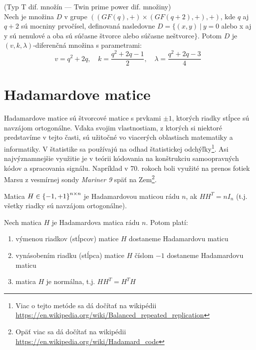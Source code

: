 \begin{theorem_hard}{(Typ T dif. množín --- Twin prime power dif. množiny)}\\ 
	Nech je množina $D$ v grupe $((GF(q), +) \times (GF(q + 2), +), +)$, kde $q$ aj $q + 2$ sú mocniny prvočísel, definovaná nasledovne $D = \{(x, y) ~|~ y = 0$ alebo x aj y sú nenulové a oba sú súčasne štvorce alebo súčasne neštvorce$\}$. Potom $D$ je $(v, k, \lambda)$-diferenčná množina s parametrami:
	$$v = q^2 + 2q, \quad k = \frac{q^2 + 2q - 1}{2}, \quad \lambda = \frac{q^2 + 2q - 3}{4}$$
\end{theorem_hard}


\section{Hadamardove matice}

Hadamardove matice sú štvorcové matice s prvkami $\pm 1$, ktorých riadky stĺpce sú navzájom ortogonálne. Vďaka svojim vlastnostiam, z ktorých si niektoré predstavíme v tejto časti, sú užitočné vo viacerých oblastiach matematiky a informatiky. V štatistike sa používajú na odhad štatistickej odchýľky\footnote{Viac o tejto metóde sa dá dočítať na wikipédii \url{https://en.wikipedia.org/wiki/Balanced_repeated_replication}}. Asi najvýznamnejšie využitie je v teórii kódovania na konštrukciu samoopravných kódov a spracovania signálu. Napríklad v 70. rokoch boli využité na prenos fotiek Marsu z vesmírnej sondy \emph{Mariner 9} späť na Zem\footnote{Opäť viac sa dá dočítať na wikipédii \url{https://en.wikipedia.org/wiki/Hadamard_code}}.

\begin{definition}
Matica $H \in \left\{-1, +1\right\}^{n \times n}$ je Hadamardovou maticou rádu $n$, ak $HH^T = nI_n$ (t.j. všetky riadky sú navzájom ortogonálne).
\end{definition}

\begin{theorem}
Nech matica $H$ je Hadamardova matica rádu $n$. Potom platí:
\begin{enumerate}
    \item výmenou riadkov (stĺpcov) matice $H$ dostaneme Hadamardovu maticu
    \item vynásobením riadku (stĺpca) matice $H$ číslom $-1$ dostaneme Hadamardovu maticu
    \item matica $H$ je normálna, t.j. $HH^T = H^T H$
\end{enumerate}
\end{theorem}


